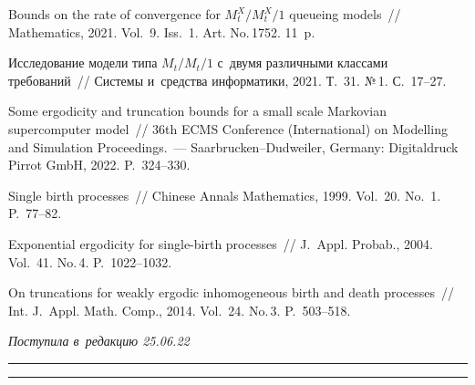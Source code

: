 \begin{multicols}{2}
{{\begin{thebibliography}{99}
 Bounds on the rate of convergence for $  
M_t^X/M_t^X/1 $ queueing models~// Mathematics, 2021. Vol.~9. Iss.~1. Art. 
No.\,1752. 11~p.

 Исследование модели типа $  M_t/M_t/1 $ с~двумя различными 
классами требований~// Сис\-те\-мы и~средства информатики, 2021. Т.~31. №\,1.\linebreak 
С.~17--27.
        
 Some ergodicity and truncation bounds for a 
small scale Markovian supercomputer model~// 36th ECMS  Conference (International) on Modelling and 
Simulation Proceedings.~--- Saarbrucken--Dudweiler, Germany: Digitaldruck Pirrot 
GmbH, 2022. P.~324--330.

 Single birth processes~// Chinese Annals Mathematics, 1999. 
Vol.~20. No.~1. P.~77--82.

 Exponential ergodicity for single-birth 
processes~// J.~Appl. Probab., 2004. Vol.~41. No.\,4. P.~1022--1032.

 On truncations for weakly 
ergodic inhomogeneous birth and death processes~// Int. J.~Appl. Math. Comp., 2014. Vol.~24. No.\,3. P.~503--518.
  \end{thebibliography}

 }
 }

\end{multicols}

\vspace*{-9pt}

\hfill{\small\textit{Поступила в~редакцию 25.06.22}}

\vspace*{6pt}




\hrule

\vspace*{2pt}

\hrule


\def\tit{ON AN APPROACH FOR ESTIMATING THE~RATE OF~CONVERGENCE FOR~NONSTATIONARY MARKOV MODELS OF~QUEUEING SYSTEMS}


